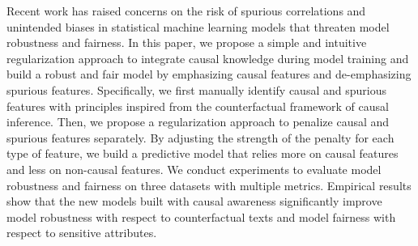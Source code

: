 Recent work has raised concerns on the risk of spurious correlations and unintended biases in statistical machine learning models that threaten model robustness and fairness. In this paper, we propose a simple and intuitive regularization approach to integrate causal knowledge during model training and build a robust and fair model by emphasizing causal features and de-emphasizing spurious features. Specifically, we first manually identify causal and spurious features with principles inspired from the counterfactual framework of causal inference. Then, we propose a regularization approach to penalize causal and spurious features separately. By adjusting the strength of the penalty for each type of feature, we build a predictive model that relies more on causal features and less on non-causal features. We conduct experiments to evaluate model robustness and fairness on three datasets with multiple metrics. Empirical results show that the new models built with causal awareness significantly improve model robustness with respect to counterfactual texts and model fairness with respect to sensitive attributes.
